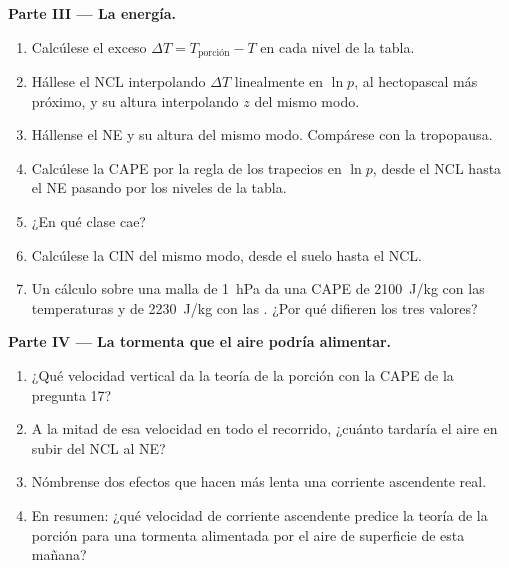 \begin{problem}
\medskip\noindent\textbf{Parte III --- La energía.}
\begin{enumerate}[resume]
  \item Calcúlese el exceso $\Delta T = T_{\text{porción}} - T$ en cada nivel de la tabla.
  \item Hállese el NCL interpolando $\Delta T$ linealmente en $\ln p$, al hectopascal más próximo,
        y su altura interpolando $z$ del mismo modo.
  \item Hállense el NE y su altura del mismo modo. Compárese con la tropopausa.
  \item Calcúlese la CAPE por la regla de los trapecios en $\ln p$, desde el NCL hasta el NE pasando por los
        niveles de la tabla.
  \item ¿En qué clase cae?
  \item Calcúlese la CIN del mismo modo, desde el suelo hasta el NCL.
  \item Un cálculo sobre una malla de \qty{1}{hPa} da una CAPE de \qty{2100}{J/kg} con las
        temperaturas y de \qty{2230}{J/kg} con las . ¿Por qué difieren los tres
        valores?
\end{enumerate}

\medskip\noindent\textbf{Parte IV --- La tormenta que el aire podría alimentar.}
\begin{enumerate}[resume]
  \item ¿Qué velocidad vertical da la teoría de la porción con la CAPE de la pregunta 17?
  \item A la mitad de esa velocidad en todo el recorrido, ¿cuánto tardaría el aire en subir del NCL al NE?
  \item Nómbrense dos efectos que hacen más lenta una corriente ascendente real.
  \item En resumen: ¿qué velocidad de corriente ascendente predice la teoría de la porción para una tormenta alimentada por el
        aire de superficie de esta mañana?
\end{enumerate}
\end{problem}
